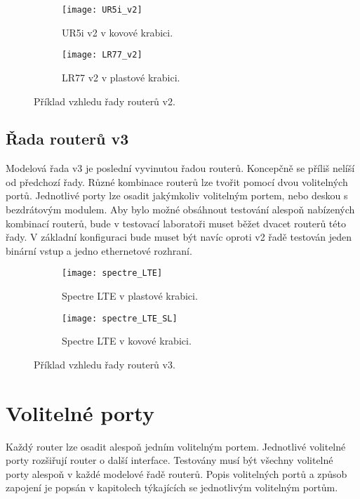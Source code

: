 \begin{figure}[h]
  \begin{subfigure}[h]{0.5\LW}
    \centering
    \texttt{[image: UR5i\_v2]}
    \caption{UR5i v2 v kovové krabici.}
    \label{fig:UR5i_v2}
  \end{subfigure}
  \begin{subfigure}[h]{0.5\LW}
    \centering
    \texttt{[image: LR77\_v2]}
    \caption{LR77 v2 v plastové krabici.}
    \label{fig:LR77_v2}
  \end{subfigure}
  \caption{Příklad vzhledu řady routerů v2.}
  \label{fig:UR5i_v2}
\end{figure}

\subsection{Řada routerů v3}
Modelová řada v3 je poslední vyvinutou řadou routerů. Koncepčně se příliš nelíší od předchozí řady. Různé kombinace routerů lze tvořit pomocí dvou volitelných portů. Jednotlivé porty lze osadit jakýmkoliv volitelným portem, nebo deskou s bezdrátovým modulem. Aby bylo možné obsáhnout testování alespoň nabízených kombinací routerů, bude v testovací laboratoři muset běžet dvacet routerů této řady. V základní konfiguraci bude muset být navíc oproti v2 řadě testován jeden binární vstup a jedno ethernetové rozhraní.

\begin{figure}[h]
  \begin{subfigure}[h]{0.5\LW}
    \centering
    \texttt{[image: spectre\_LTE]}
    \caption{Spectre LTE v plastové krabici.}
    \label{fig:spectre_LTE}
  \end{subfigure}
  \begin{subfigure}[h]{0.5\LW}
    \centering
    \texttt{[image: spectre\_LTE\_SL]}
    \caption{Spectre LTE v kovové krabici.}
    \label{fig:spectre_LTE_SL}
  \end{subfigure}
  \caption{Příklad vzhledu řady routerů v3.}
  \label{fig:spectre_LTE}
\end{figure}

\section{Volitelné porty}
Každý router lze osadit alespoň jedním volitelným portem. Jednotlivé volitelné porty rozšiřují router o další interface. Testovány musí být všechny volitelné porty alespoň v každé modelové řadě routerů. Popis volitelných portů a způsob zapojení je popsán v kapitolech týkajících se jednotlivým volitelným portům.

